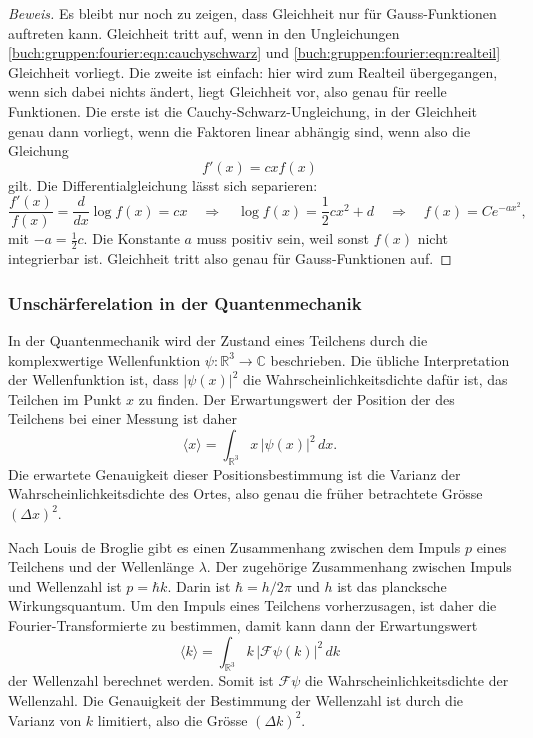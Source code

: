 \begin{proof}[Beweis]
Es bleibt nur noch zu zeigen, dass Gleichheit nur für Gauss-Funktionen
auftreten kann.
Gleichheit tritt auf, wenn in den Ungleichungen
\eqref{buch:gruppen:fourier:eqn:cauchyschwarz}
und
\eqref{buch:gruppen:fourier:eqn:realteil}
Gleichheit vorliegt.
Die zweite ist einfach: hier wird zum Realteil übergegangen, wenn sich
dabei nichts ändert, liegt Gleichheit vor, also genau für reelle Funktionen.
Die erste ist die Cauchy-Schwarz-Ungleichung, in der Gleichheit genau
dann vorliegt, wenn die Faktoren linear abhängig sind, wenn also
die Gleichung
\[
f'(x)
=
c
xf(x)
\]
gilt.
Die Differentialgleichung  lässt sich separieren:
\[
\frac{f'(x)}{f(x)} = \frac{d}{dx}\log f(x) = cx
\quad\Rightarrow\quad
\log f(x) = \frac12cx^2 + d
\quad\Rightarrow\quad
f(x) = Ce^{-ax^2},
\]
mit $-a = \frac12c$.
Die Konstante $a$ muss positiv sein, weil sonst $f(x)$ nicht
integrierbar ist.
Gleichheit tritt also genau für Gauss-Funktionen auf.
\end{proof}

%
%
\subsubsection{Unschärferelation in der Quantenmechanik}
%
In der Quantenmechanik wird der Zustand eines Teilchens durch die 
komplexwertige Wellenfunktion $\psi\colon\mathbb{R}^3\to\mathbb{C}$
beschrieben.
Die übliche Interpretation der Wellenfunktion ist, dass $|\psi(x)|^2$
die Wahrscheinlichkeitsdichte dafür ist, das Teilchen im Punkt $x$ zu
finden.
Der Erwartungswert der Position der des Teilchens bei einer Messung
ist daher
\[
\langle x\rangle
=
\int_{\mathbb{R}^3} x\, |\psi(x)|^2\,dx.
\]
Die erwartete Genauigkeit dieser Positionsbestimmung ist die Varianz
der Wahrscheinlichkeitsdichte des Ortes, also genau die früher
betrachtete Grösse $(\Delta x)^2$.

Nach Louis de Broglie gibt es einen Zusammenhang zwischen dem Impuls $p$
%
eines Teilchens und der Wellenlänge $\lambda$.
Der zugehörige Zusammenhang zwischen Impuls und Wellenzahl ist
$p = \hbar k$.
Darin ist $\hbar = h/2\pi$ und $h$ ist das plancksche Wirkungsquantum.
%
%
Um den Impuls eines Teilchens vorherzusagen, ist daher die
Fourier-Transformierte zu bestimmen, damit kann dann der Erwartungswert
\[
\langle k\rangle 
=
\int_{\mathbb{R}^3} k\, |\mathscr{F}\psi(k)|^2\,dk
\]
der Wellenzahl berechnet werden.
Somit ist $\mathscr{F}\psi$ die Wahrscheinlichkeitsdichte der
Wellenzahl.
Die Genauigkeit der Bestimmung der Wellenzahl ist durch die Varianz
von $k$ limitiert, also die Grösse $(\Delta k)^2$.


